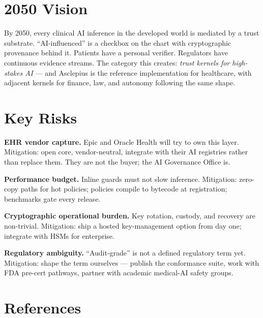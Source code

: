 \documentclass[11pt,a4paper]{article}
\begin{document}
\section{2050 Vision}

By 2050, every clinical AI inference in the developed world is mediated by a trust substrate. ``AI-influenced'' is a checkbox on the chart with cryptographic provenance behind it. Patients have a personal verifier. Regulators have continuous evidence streams. The category this creates: \emph{trust kernels for high-stakes AI} --- and Asclepius is the reference implementation for healthcare, with adjacent kernels for finance, law, and autonomy following the same shape.

\section{Key Risks}

\begin{warnbox}
\textbf{EHR vendor capture.} Epic and Oracle Health will try to own this layer. Mitigation: open core, vendor-neutral, integrate with their AI registries rather than replace them. They are not the buyer; the AI Governance Office is.

\textbf{Performance budget.} Inline guards must not slow inference. Mitigation: zero-copy paths for hot policies; policies compile to bytecode at registration; benchmarks gate every release.

\textbf{Cryptographic operational burden.} Key rotation, custody, and recovery are non-trivial. Mitigation: ship a hosted key-management option from day one; integrate with HSMs for enterprise.

\textbf{Regulatory ambiguity.} ``Audit-grade'' is not a defined regulatory term yet. Mitigation: shape the term ourselves --- publish the conformance suite, work with FDA pre-cert pathways, partner with academic medical-AI safety groups.
\end{warnbox}

\section{References}
\end{document}
